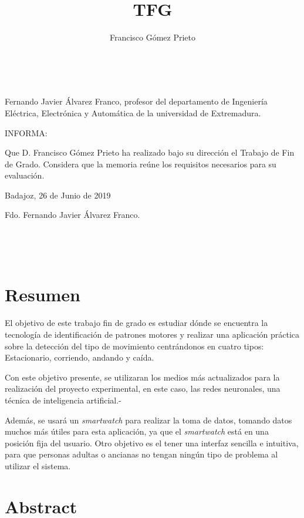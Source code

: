 \documentclass[12pt]{book}
\title{TFG}
\author{Francisco Gómez Prieto}
\date{}
\numberwithin{equation}{section}
\begin{document}
\pagestyle{empty}
\lstset{language=Java, columns=flexible}


\newpage
~

\newpage
Fernando Javier Álvarez Franco, profesor del departamento de Ingeniería Eléctrica, Electrónica y Automática de la universidad de Extremadura.

INFORMA:

Que D. Francisco Gómez Prieto ha realizado bajo su dirección el Trabajo de Fin de Grado. Considera que la memoria reúne los requisitos necesarios para su evaluación.

\medskip

\begin{flushright}
Badajoz, 26 de Junio de 2019
\end{flushright}

\vspace{8\baselineskip}
\begin{center}
Fdo. Fernando Javier Álvarez Franco.
\end{center}
\newpage
~
\newpage
\setcounter{page}{1}
\pagestyle{plain}
\tableofcontents

\newpage
~

\newpage
\chapter*{Resumen}
El objetivo de este trabajo fin de grado es estudiar dónde se encuentra la tecnología de identificación de patrones motores y realizar una aplicación práctica sobre la detección del tipo de movimiento centrándonos en cuatro tipos: Estacionario, corriendo, andando y caída.

Con este objetivo presente, se utilizaran los medios más actualizados para la realización del proyecto experimental, en este caso, las redes neuronales, una técnica de inteligencia artificial.-

Además, se usará un \textit{smartwatch} para realizar la toma de datos, tomando datos muchos más útiles para esta aplicación, ya que el \textit{smartwatch} está en una posición fija del usuario. Otro objetivo es el tener una interfaz sencilla e intuitiva, para que personas adultas o ancianas no tengan ningún tipo de problema al utilizar el sistema.


\newpage
\chapter*{Abstract}
\end{document}
